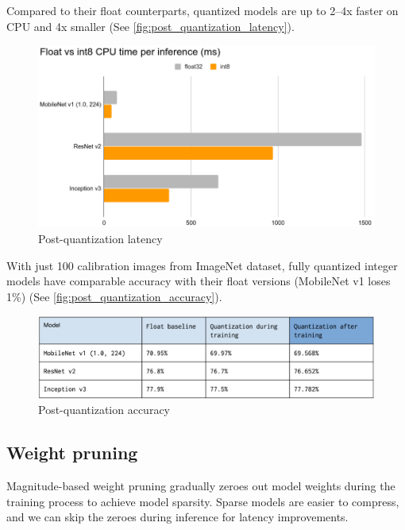 Compared to their float counterparts, quantized models are up to 2–4x faster on
CPU and 4x smaller (See \autoref{fig:post_quantization_latency}).

\begin{figure}[ht]
    \includegraphics[width=\textwidth]{images/introduction/post_quantization_latency.png}
    \centering
    \caption{Post-quantization latency}\label{fig:post_quantization_latency}
\end{figure}

With just 100 calibration images from ImageNet dataset, fully quantized integer
models have comparable accuracy with their float versions (MobileNet v1 loses
1\%) (See \autoref{fig:post_quantization_accuracy}).

\begin{figure}[ht]
    \includegraphics[width=\textwidth]{images/introduction/post_quantization_accuracy.png}
    \centering
    \caption{Post-quantization accuracy}\label{fig:post_quantization_accuracy}
\end{figure}

\subsection{Weight pruning}
Magnitude-based weight pruning gradually zeroes out model weights during the
training process to achieve model sparsity. Sparse models are easier to
compress, and we can skip the zeroes during inference for latency improvements.


